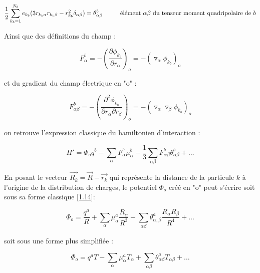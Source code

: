 	
\begin{flushleft}
	\begin{equation*}
	\frac{1}{2} \sum_{k_{b}=1}^{N_{b}} e_{k_{b}} (3r_{k_{b}\alpha} r_{k_{b}\beta}- r^{2}_{k_{b}}\delta_{\alpha \beta}) = \theta_{\alpha \beta}^{b}  \hspace{1cm} \textup{élément $\alpha\beta$ du tenseur moment quadripolaire de $b$}
	\end{equation*}
\end{flushleft}
	
Ainsi que des définitions du champ :
	
\begin{equation}
F_{\alpha}^{b} = - \left(\frac{\partial \phi_{k_{b}}}{\partial r_{\alpha}}\right)_{o} = - (\triangledown_{\alpha} \phi_{k_{b}})_{o} \label{1.11}
\end{equation}
	
et du gradient du champ électrique en "o" : 
	
\begin{equation}
F_{\alpha\beta}^{b} = - \left(\frac{\partial^{2} \phi_{k_{b}}}{\partial r_{\alpha} \partial r_{\beta}}\right)_{o} = - (\triangledown_{\alpha} \triangledown_{\beta} \phi_{k_{b}})_{o} \label{1.12}
\end{equation}

on retrouve l'expression classique du hamiltonien d'interaction : 
	
\begin{equation}
H' = \Phi_{o} q^{b} - \sum_{\alpha} F_{\alpha}^{b} \mu_{\alpha}^{b} - \frac{1}{3} \sum_{\alpha\beta} F_{\alpha\beta}^{b} \theta_{\alpha\beta}^{b} + \ldots
\end{equation}
	
En posant le vecteur $\overrightarrow{R_{k}}= \overrightarrow{R} - \overrightarrow{r_{k}}$ qui représente la distance de la particule $k$ à l'origine de la distribution de charges, le potentiel $\Phi_{o}$ créé en "o" peut s'écrire soit sous sa forme classique \ref{1.14}:
	
\begin{equation}
\Phi_{o} = \frac{q^{a}}{R} + \sum_{\alpha} \mu_{\alpha}^{a} \frac{R_{\alpha}}{R^{3}} + \sum_{\alpha\beta} \theta_{\alpha,\beta}^{a} \frac{R_{\alpha} R_{\beta}}{R^{4}} + \ldots \label{1.14}
\end{equation}
	
soit sous une forme plus simplifiée : 
	
\begin{equation}
\Phi_{o} = q^{a} T - \sum_{\alpha} \mu_{\alpha}^{a} T_{\alpha} + \sum_{\alpha\beta} \theta_{\alpha\beta}^{a} T_{\alpha\beta} + \ldots
\end{equation}
		
